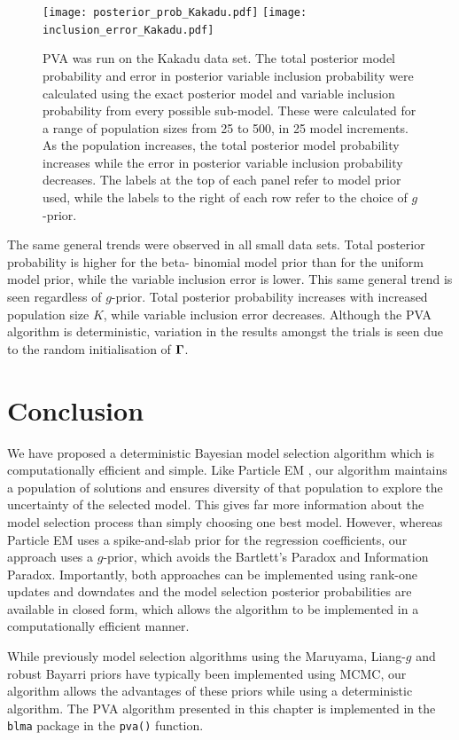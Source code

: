 \begin{figure}[ht!]
	\texttt{[image: posterior\_prob\_Kakadu.pdf]}
	\texttt{[image: inclusion\_error\_Kakadu.pdf]}

	\caption{ PVA was run on the Kakadu data set. The total posterior model
		probability and error in posterior variable inclusion probability were
		calculated using the exact posterior model and variable  inclusion
		probability from every possible sub-model. These were calculated for a
		range of population sizes from 25 to 500, in 25 model increments.  As
		the population increases, the total posterior model probability increases
		while the error in posterior variable inclusion probability decreases.  
		The labels at the top of each panel refer to model prior used, while
		the labels to the right of each row refer to the choice of $g$-prior.
	}
\label{fig:kakadu_total_posterior_mass} \end{figure}


The same general trends were observed in all small data sets. Total posterior
probability is higher for the beta- binomial model prior than for the uniform
model prior, while the variable inclusion error is lower. This same general
trend is seen regardless of $g$-prior. Total posterior probability increases
with increased population size $K$, while variable inclusion error decreases.
Although the PVA algorithm is deterministic, variation in the results amongst
the trials is seen due to the random initialisation of ${\boldsymbol \Gamma}$.

\section{Conclusion}
\label{sec:chapter_4_conclusion}
We have proposed a deterministic Bayesian model selection algorithm which is
computationally efficient and simple. Like Particle EM \citep{Rockova2017}, our
algorithm maintains a population of solutions and ensures diversity of that
population to explore the uncertainty of the selected model. This gives far
more information about the model selection process than simply choosing one
best model. However, whereas Particle EM uses a spike-and-slab prior for the
regression coefficients, our approach uses a $g$-prior, which avoids the
Bartlett's Paradox and Information Paradox. Importantly, both approaches can be
implemented using rank-one updates and downdates and the model selection
posterior probabilities are available in closed form, which allows the
algorithm to be implemented in a computationally efficient manner.

While previously model selection algorithms using the Maruyama, Liang-$g$ and
robust Bayarri priors have typically been implemented using MCMC, our algorithm
allows the advantages of these priors while using a deterministic algorithm.
The PVA algorithm  presented in this chapter is implemented in the {\tt blma}
package in the {\tt pva()} function.
